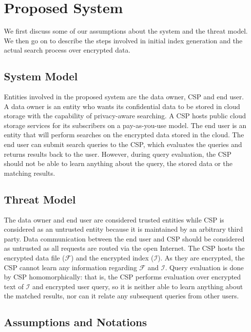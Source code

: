 \section{Proposed System}
\label{sec:system}


We first discuss some of our assumptions
about the system and the threat model. We then go on to describe the
steps involved in initial index generation
and the actual search process over encrypted data.

\subsection{System Model}

Entities involved in the proposed system are the data owner, CSP and end user.
A data owner is an entity who wants its confidential data to be stored in cloud storage with the capability of privacy-aware searching. 
A CSP hosts public cloud storage services for its subscribers on 
a pay-as-you-use model. The end user is an entity that will perform searches on the 
encrypted data stored in the cloud. The end user can submit search queries 
to the CSP, which evaluates the queries and returns results back to the user. 
However, during query evaluation, the CSP should not be able to learn anything about the query, 
the stored data or the matching results.

\subsection{Threat Model}

The data owner and end user are considered trusted entities while CSP 
is considered as an untrusted entity because it is maintained by an 
arbitrary third party. Data communication between the end user and CSP should 
be considered as untrusted as all requests are routed via the open Internet. 
The CSP hosts the encrypted data file ($\mathcal{F}$) and the encrypted index ($\mathcal{I}$). 
As they are encrypted, the CSP cannot learn any information regarding $\mathcal{F}$ and $\mathcal{I}$. 
Query evaluation is done by CSP homomorphically: that is, the CSP performs 
evaluation over encrypted text of $\mathcal{I}$ and encrypted user query, 
so it is neither able to learn anything about the matched results, nor
can it relate any subsequent queries from other users. 

\subsection{Assumptions and Notations}

